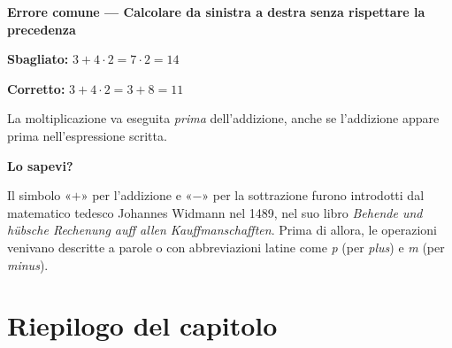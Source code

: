 \begin{attenzione}
  \textbf{Errore comune — Calcolare da sinistra a destra senza rispettare la precedenza}

  \medskip
  \textbf{Sbagliato:} \quad $3 + 4 \cdot 2 = 7 \cdot 2 = 14$

  \textbf{Corretto:} \quad $3 + 4 \cdot 2 = 3 + 8 = 11$

  La moltiplicazione va eseguita \emph{prima} dell'addizione, anche se l'addizione appare prima nell'espressione scritta.
\end{attenzione}

\begin{sapevi}
  \textbf{Lo sapevi?}

  Il simbolo «$+$» per l'addizione e «$-$» per la sottrazione furono introdotti dal matematico tedesco Johannes Widmann nel 1489, nel suo libro \emph{Behende und hübsche Rechenung auff allen Kauffmanschafften}. Prima di allora, le operazioni venivano descritte a parole o con abbreviazioni latine come \emph{p} (per \emph{plus}) e \emph{m} (per \emph{minus}).
\end{sapevi}

\section*{Riepilogo del capitolo}

